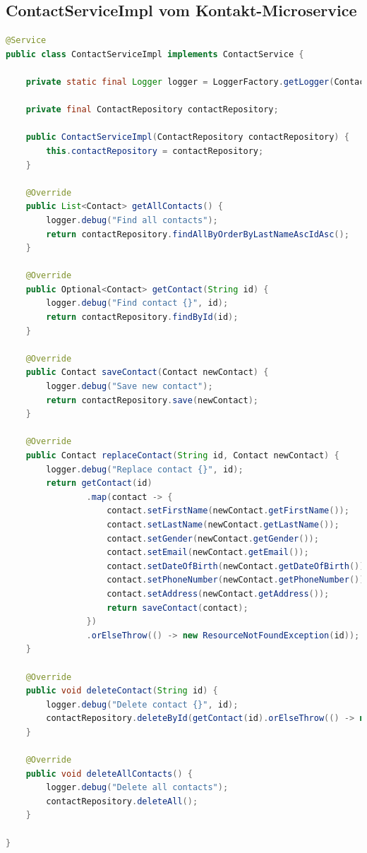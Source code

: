 \clearpage
\subsection*{ContactServiceImpl vom Kontakt-Microservice}

\begin{lstlisting}[language=java]
@Service
public class ContactServiceImpl implements ContactService {

    private static final Logger logger = LoggerFactory.getLogger(ContactApplication.class);

    private final ContactRepository contactRepository;

    public ContactServiceImpl(ContactRepository contactRepository) {
        this.contactRepository = contactRepository;
    }

    @Override
    public List<Contact> getAllContacts() {
        logger.debug("Find all contacts");
        return contactRepository.findAllByOrderByLastNameAscIdAsc();
    }

    @Override
    public Optional<Contact> getContact(String id) {
        logger.debug("Find contact {}", id);
        return contactRepository.findById(id);
    }

    @Override
    public Contact saveContact(Contact newContact) {
        logger.debug("Save new contact");
        return contactRepository.save(newContact);
    }

    @Override
    public Contact replaceContact(String id, Contact newContact) {
        logger.debug("Replace contact {}", id);
        return getContact(id)
                .map(contact -> {
                    contact.setFirstName(newContact.getFirstName());
                    contact.setLastName(newContact.getLastName());
                    contact.setGender(newContact.getGender());
                    contact.setEmail(newContact.getEmail());
                    contact.setDateOfBirth(newContact.getDateOfBirth());
                    contact.setPhoneNumber(newContact.getPhoneNumber());
                    contact.setAddress(newContact.getAddress());
                    return saveContact(contact);
                })
                .orElseThrow(() -> new ResourceNotFoundException(id));
    }

    @Override
    public void deleteContact(String id) {
        logger.debug("Delete contact {}", id);
        contactRepository.deleteById(getContact(id).orElseThrow(() -> new ResourceNotFoundException(id)).getId());
    }

    @Override
    public void deleteAllContacts() {
        logger.debug("Delete all contacts");
        contactRepository.deleteAll();
    }

}
\end{lstlisting}


